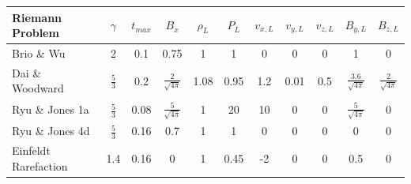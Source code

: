 \documentclass[modern]{aastex631}
\begin{document}
\begin{table}
    \centering
    \begin{tabular}{lcccccccccc}





        Riemann Problem & $\gamma$ & $t_{max}$ & $B_x$ & $\rho_L$ & $P_L$ & $v_{x,L}$ & $v_{y,L}$ & $v_{z,L}$ & $B_{y,L}$ & $B_{z,L}$  \\ \hline

        Brio \& Wu           & 2             & 0.1  & 0.75                    & 1    & 1    & 0    & 0    & 0   & 1                         & 0                       \\ \hline
        Dai \& Woodward      & $\frac{5}{3}$ & 0.2  & $\frac{2}{\sqrt{4\pi}}$ & 1.08 & 0.95 & 1.2  & 0.01 & 0.5 & $\frac{3.6}{\sqrt{4\pi}}$ & $\frac{2}{\sqrt{4\pi}}$ \\ \hline
        Ryu \& Jones 1a      & $\frac{5}{3}$ & 0.08 & $\frac{5}{\sqrt{4\pi}}$ & 1    & 20   & 10   & 0    & 0   & $\frac{5}{\sqrt{4\pi}}$   & 0                       \\ \hline
        Ryu \& Jones 4d      & $\frac{5}{3}$ & 0.16 & 0.7                     & 1    & 1    & 0    & 0    & 0   & 0                         & 0                       \\ \hline
        Einfeldt Rarefaction & 1.4           & 0.16 & 0                       & 1    & 0.45 & -2   & 0    & 0   & 0.5                       & 0                       \\ \hline


\end{tabular}
\end{table}
\end{document}
